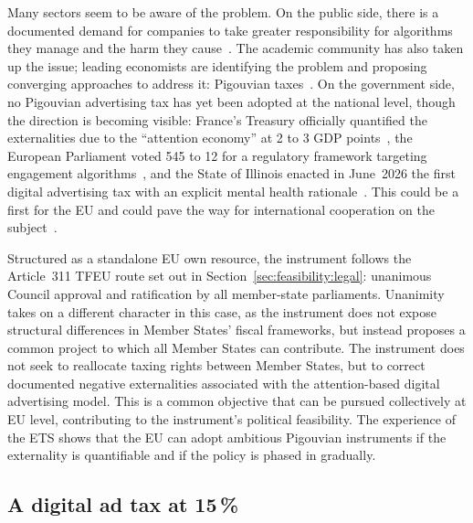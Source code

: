 \documentclass[../../main]{subfiles}
\begin{document}
Many sectors seem to be aware of the problem. On the public side, there is a documented demand for companies to take greater responsibility for algorithms they manage and the harm they cause~\citep{reuters_ipsos_2026, pew_2026}. 
The academic community has also taken up the issue; leading economists are identifying the problem and proposing converging approaches to address it: Pigouvian taxes~\citep{petropoulos_bruegel_2021, romer_adtax_2021, belgroun_michel_gandon_2025, acemoglu_johnson_2024_ad_tax}. 
On the government side, no Pigouvian advertising tax has yet been adopted at the national level, though the direction is becoming visible: France's Treasury officially quantified the externalities due to the ``attention economy'' at 2 to 3 GDP points~\citep{dg_tresor_369_2025}, %
the European Parliament voted 545 to 12 for a regulatory framework targeting engagement algorithms~\citep{ep_resolution_t9_2023}, and the State of Illinois enacted in June~2026 the first digital advertising tax with an explicit mental health rationale~\citep{illinois_sb3019_2026}. 
This could be a first for the EU and could pave the way for international cooperation on the subject~\citep{acemoglu_johnson_2024_ad_tax}.

Structured as a standalone EU own resource, the instrument follows the Article~311 TFEU route set out in Section~\ref{sec:feasibility:legal}: unanimous Council approval and ratification by all member-state parliaments.
Unanimity takes on a different character in this case, as the instrument does not expose structural differences in Member States' fiscal frameworks, but instead proposes a common project to which all Member States can contribute.
The instrument does not seek to reallocate taxing rights between Member States, but to correct documented negative externalities associated with the attention-based digital advertising model.
This is a common objective that can be pursued collectively at EU level, contributing to the instrument's political feasibility.
The experience of the ETS shows that the EU can adopt ambitious Pigouvian instruments if the externality is quantifiable and if the policy is phased in gradually. 


\subsection{A digital ad tax at 15\,\%}
\end{document}
